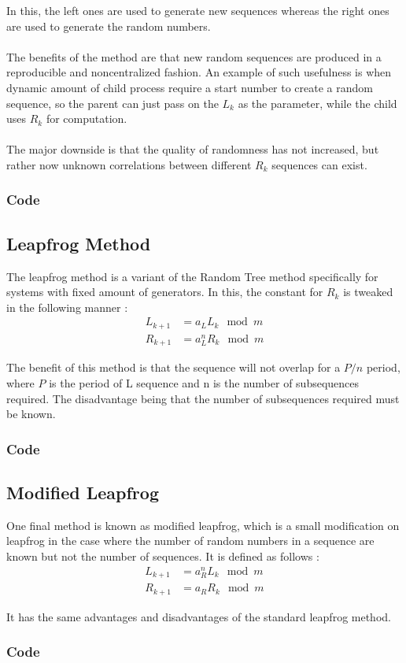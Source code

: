 \noindent In this, the left ones are used to generate new 
sequences whereas the right ones are used to generate the 
random numbers.
\\\\
The benefits of the method are that new random
sequences are produced in a reproducible and noncentralized 
fashion. An example of such usefulness is when dynamic 
amount of child process require a start number to create 
a random sequence, so the parent can just pass on the 
$L_k$ as the parameter, while the child uses $R_k$ for 
computation.
\\\\
The major downside is that the quality of randomness has not 
increased, but rather now unknown correlations between 
different $R_k$ sequences can exist.

\subsubsection{Code}


\subsection{Leapfrog Method}
The leapfrog method is a variant of the Random Tree method 
specifically for systems with fixed amount of generators. 
In this, the constant for $R_k$ is tweaked in the following 
manner :
\begin{align*}
    L_{k+1} &= a_L L_k \mod m\\
    R_{k+1} &= a_L^n R_k \mod m
\end{align*}

\noindent The benefit of this method is that the sequence 
will not overlap for a $P/n$ period, where $P$ is the period 
of L sequence and n is the number of subsequences required. 
The disadvantage being that the number of subsequences 
required must be known.

\subsubsection{Code}


\subsection{Modified Leapfrog}
One final method is known as modified leapfrog, which is a 
small modification on leapfrog in the case where the number 
of random numbers in a sequence are known but not the number 
of sequences. It is defined as follows :
\begin{align*}
    L_{k+1} &= a_R^n L_k \mod m\\
    R_{k+1} &= a_R R_k \mod m
\end{align*}

\noindent It has the same advantages and disadvantages of 
the standard leapfrog method.

\subsubsection{Code}
